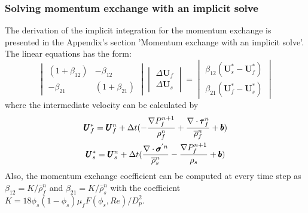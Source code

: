 \documentclass[preprint,12pt]{elsarticle}
\providecommand{\DIFadd}[1]{{\protect\color{blue}\uwave{#1}}} %
\providecommand{\DIFdel}[1]{{\protect\color{red}\sout{#1}}}                      %
\providecommand{\DIFaddbegin}{} %
\providecommand{\DIFaddend}{} %
\providecommand{\DIFdelbegin}{} %
\providecommand{\DIFdelend}{} %
\newcommand{\DIFscaledelfig}{0.5}
\newlength{\DIFdelgraphicswidth} %
\newlength{\DIFdelgraphicsheight} %
\newcommand{\DIFaddincludegraphics}[2][]{{\color{blue}\fbox{\DIFOincludegraphics[#1]{#2}}}} %
\newcommand{\DIFdelincludegraphics}[2][]{%
\sbox{\DIFdelgraphicsbox}{\DIFOincludegraphics[#1]{#2}}%
\settoboxwidth{\DIFdelgraphicswidth}{\DIFdelgraphicsbox} %
\settoboxtotalheight{\DIFdelgraphicsheight}{\DIFdelgraphicsbox} %
\scalebox{\DIFscaledelfig}{%
\parbox[b]{\DIFdelgraphicswidth}{\usebox{\DIFdelgraphicsbox}\\[-\baselineskip] \rule{\DIFdelgraphicswidth}{0em}}\llap{\resizebox{\DIFdelgraphicswidth}{\DIFdelgraphicsheight}{%
\setlength{\unitlength}{\DIFdelgraphicswidth}%
\begin{picture}(1,1)%
\thicklines\linethickness{2pt} %
{\color[rgb]{1,0,0}\put(0,0){\framebox(1,1){}}}%
{\color[rgb]{1,0,0}\put(0,0){\line( 1,1){1}}}%
{\color[rgb]{1,0,0}\put(0,1){\line(1,-1){1}}}%
\end{picture}%
}\hspace*{3pt}}} %
} %
\DeclareRobustCommand{\DIFaddbegin}{\DIFOaddbegin \let\includegraphics\DIFaddincludegraphics} %
\DeclareRobustCommand{\DIFaddend}{\DIFOaddend \let\includegraphics\DIFOincludegraphics} %
\DeclareRobustCommand{\DIFdelbegin}{\DIFOdelbegin \let\includegraphics\DIFdelincludegraphics} %
\DeclareRobustCommand{\DIFdelend}{\DIFOaddend \let\includegraphics\DIFOincludegraphics} %
\begin{document}
\subsubsection{Solving momentum exchange with an implicit \DIFdelbegin \DIFdel{solve}\DIFdelend \DIFaddbegin \DIFadd{solver}\DIFaddend }
The derivation of the implicit integration for the momentum exchange is presented in the Appendix's section 'Momentum exchange with an implicit solve'. The linear equations 
has the form:
%
\[ \begin{vmatrix} (1 + \beta_{12})  &  -\beta_{12} \\
                  -\beta_{21}       &  (1 + \beta_{21})
    \end{vmatrix}
    \begin{vmatrix} \Delta \pmb{U}_{f} \\
                    \Delta \pmb{U}_{s}
    \end{vmatrix}
    =
    \begin{vmatrix}  \beta_{12}(\pmb{U}_{s}^{*} - \pmb{U}_{f}^{*}) \\
                    \beta_{21}(\pmb{U}_{f}^{*} - \pmb{U}_{s}^{*})
    \end{vmatrix}                
\]
%
%
where the intermediate velocity can be calculated by
%
\begin{equation}
\begin{gathered}
\pmb{U}_{f}^{*} = \pmb{U}_{f}^{n} + \Delta{t} (-\frac{\nabla P_{f}^{n+1}}{\rho_f^n}  + \frac {\nabla \cdot \pmb{\tau}_f^{n}}{\overline{\rho}^n_{f}} + \pmb{b}) \\
\pmb{U}_{s}^{*} = \pmb{U}_{s}^{n} + \Delta{t} (\frac{\nabla \cdot \pmb{\sigma}^{'n}}{\overline{\rho}^n_{s}}    - \frac{\nabla P_{f}^{n+1}}{\rho_s}  + \pmb{b})
\end{gathered}
\end{equation}
%
%
Also, the momentum exchange coefficient can be computed at every time step as $\beta_{12} = K/\overline{\rho}_{f}^n$ and $\beta_{21} = K/\overline{\rho}_{s}^n$ with the coefficient $K =  18\phi_s(1-\phi_s)\mu_f  F(\phi_s, Re) /D_p^2$.

\end{document}
